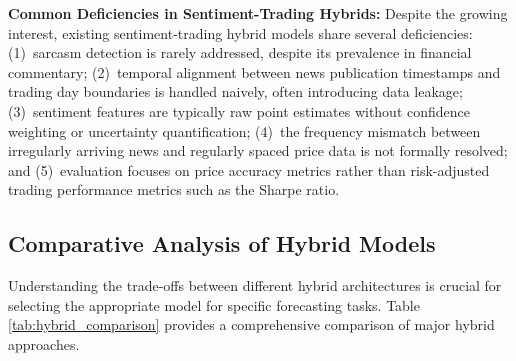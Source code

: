 \textbf{Common Deficiencies in Sentiment-Trading Hybrids:}
Despite the growing interest, existing sentiment-trading hybrid models share several deficiencies: (1)~sarcasm detection is rarely addressed, despite its prevalence in financial commentary; (2)~temporal alignment between news publication timestamps and trading day boundaries is handled naively, often introducing data leakage; (3)~sentiment features are typically raw point estimates without confidence weighting or uncertainty quantification; (4)~the frequency mismatch between irregularly arriving news and regularly spaced price data is not formally resolved; and (5)~evaluation focuses on price accuracy metrics rather than risk-adjusted trading performance metrics such as the Sharpe ratio.

\subsection{Comparative Analysis of Hybrid Models}

Understanding the trade-offs between different hybrid architectures is crucial for selecting the appropriate model for specific forecasting tasks. Table \ref{tab:hybrid_comparison} provides a comprehensive comparison of major hybrid approaches.

